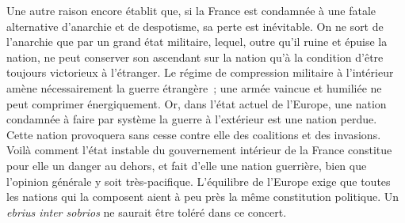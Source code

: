 \documentclass[french,twoside]{book} %
\begin{document}
Une autre raison encore établit que, si la France est condamnée à une fatale alternative d’anarchie et de despotisme, sa perte est inévitable. On ne sort de l’anarchie que par un grand état militaire, lequel, outre qu’il ruine et épuise la nation, ne peut conserver son ascendant sur la nation qu’à la condition d’être toujours victorieux à l’étranger. Le régime de compression militaire à l’intérieur amène nécessairement la guerre étrangère ; une armée vaincue et humiliée ne peut comprimer énergiquement. Or, dans l’état actuel de l’Europe, une nation condamnée à faire par système la guerre à l’extérieur est une nation perdue. Cette nation provoquera sans cesse contre elle des coalitions et des invasions. Voilà comment l’état instable du gouvernement intérieur de la France constitue pour elle un danger au dehors, et fait d’elle une nation guerrière, bien que l’opinion générale y soit très-pacifique. L’équilibre de l’Europe exige que toutes les nations qui la composent aient à peu près la même constitution politique. Un {\itshape ebrius inter sobrios} ne saurait être toléré dans ce concert.\par
\end{document}

